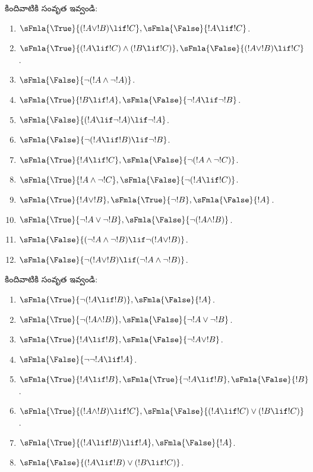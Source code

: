 \documentclass[../../../include/open-logic-section]{subfiles}
\begin{document}
\begin{prob}
కిందివాటికి సంవృత  ఇవ్వండి:
\begin{enumerate}
\item $\sFmla{\True}{(!A \lor !B) \lif !C}, \sFmla{\False}{!A \lif !C}$.
\item $\sFmla{\True}{(!A \lif !C) \land (!B \lif !C)}, \sFmla{\False}{(!A \lor !B) \lif !C}$.
\item $\sFmla{\False}{\lnot(!A \land \lnot !A)}$.
\item $\sFmla{\True}{!B \lif !A}, \sFmla{\False}{\lnot !A \lif \lnot !B}$.
\item $\sFmla{\False}{(!A \lif \lnot !A) \lif \lnot !A}$.
\item $\sFmla{\False}{\lnot(!A \lif !B) \lif \lnot !B}$.
\item $\sFmla{\True}{!A \lif !C}, \sFmla{\False}{\lnot (!A \land \lnot !C)}$.
\item $\sFmla{\True}{!A \land \lnot !C}, \sFmla{\False}{\lnot (!A \lif !C)}$.
\item $\sFmla{\True}{!A \lor !B}, \sFmla{\True}{\lnot !B}, \sFmla{\False}{!A}$.
\item $\sFmla{\True}{\lnot !A \lor \lnot !B}, \sFmla{\False}{\lnot(!A \land !B)}$.
\item $\sFmla{\False}{(\lnot !A \land \lnot !B) \lif\lnot(!A \lor !B)}$.
\item $\sFmla{\False}{\lnot(!A \lor !B) \lif (\lnot !A \land \lnot !B)}$.
\end{enumerate}
\end{prob}

\begin{prob}
కిందివాటికి సంవృత  ఇవ్వండి:
\begin{enumerate}
\item $\sFmla{\True}{\lnot(!A \lif !B)}, \sFmla{\False}{!A}$.
\item $\sFmla{\True}{\lnot(!A \land !B)}, \sFmla{\False}{\lnot !A \lor \lnot !B}$.
\item $\sFmla{\True}{!A \lif !B}, \sFmla{\False}{\lnot !A \lor !B}$.
\item $\sFmla{\False}{\lnot \lnot !A \lif !A}$.
\item $\sFmla{\True}{!A \lif !B}, \sFmla{\True}{\lnot !A \lif !B}, \sFmla{\False}{!B}$.
\item $\sFmla{\True}{(!A \land !B) \lif !C}, \sFmla{\False}{(!A \lif !C) \lor (!B \lif !C)}$.
\item $\sFmla{\True}{(!A \lif !B) \lif !A}, \sFmla{\False}{!A}$.
\item $\sFmla{\False}{(!A \lif !B) \lor (!B \lif !C)}$.
\end{enumerate}
\end{prob}
\end{document}
